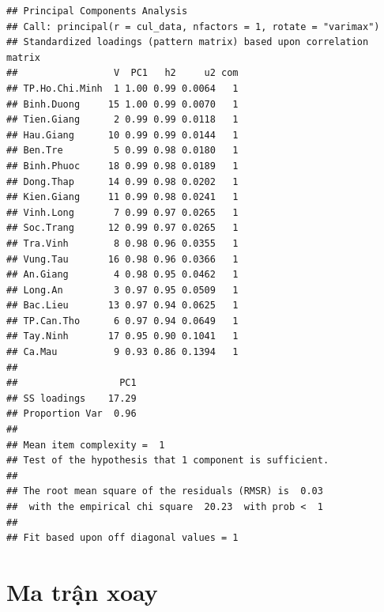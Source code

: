 \documentclass[../thesis.tex]{subfiles}
\begin{document}
\begin{verbatim}
## Principal Components Analysis
## Call: principal(r = cul_data, nfactors = 1, rotate = "varimax")
## Standardized loadings (pattern matrix) based upon correlation matrix
##                 V  PC1   h2     u2 com
## TP.Ho.Chi.Minh  1 1.00 0.99 0.0064   1
## Binh.Duong     15 1.00 0.99 0.0070   1
## Tien.Giang      2 0.99 0.99 0.0118   1
## Hau.Giang      10 0.99 0.99 0.0144   1
## Ben.Tre         5 0.99 0.98 0.0180   1
## Binh.Phuoc     18 0.99 0.98 0.0189   1
## Dong.Thap      14 0.99 0.98 0.0202   1
## Kien.Giang     11 0.99 0.98 0.0241   1
## Vinh.Long       7 0.99 0.97 0.0265   1
## Soc.Trang      12 0.99 0.97 0.0265   1
## Tra.Vinh        8 0.98 0.96 0.0355   1
## Vung.Tau       16 0.98 0.96 0.0366   1
## An.Giang        4 0.98 0.95 0.0462   1
## Long.An         3 0.97 0.95 0.0509   1
## Bac.Lieu       13 0.97 0.94 0.0625   1
## TP.Can.Tho      6 0.97 0.94 0.0649   1
## Tay.Ninh       17 0.95 0.90 0.1041   1
## Ca.Mau          9 0.93 0.86 0.1394   1
## 
##                  PC1
## SS loadings    17.29
## Proportion Var  0.96
## 
## Mean item complexity =  1
## Test of the hypothesis that 1 component is sufficient.
## 
## The root mean square of the residuals (RMSR) is  0.03 
##  with the empirical chi square  20.23  with prob <  1 
## 
## Fit based upon off diagonal values = 1
\end{verbatim}


\newpage

\section{Ma trận xoay}
\begin{Shaded}
	\begin{Highlighting}[]
\OtherTok{\textless{}{-}}\SpecialCharTok{\%\textgreater{}\%} \NormalTok{(}\SpecialCharTok{{-}}\SpecialCharTok{\%\textgreater{}\%}
	\NormalTok{, }
		 \NormalTok{)}		
\OtherTok{\textless{}{-}}\SpecialCharTok{\%\textgreater{}\%} \NormalTok{, }
		 \NormalTok{)}
\SpecialCharTok{$}
\SpecialCharTok{$}
	\end{Highlighting}
\end{Shaded}
\end{document}
